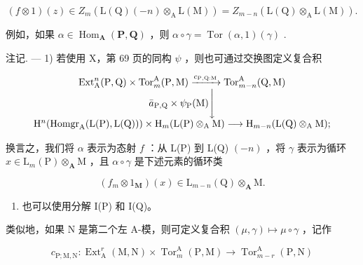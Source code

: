 \[
(f \otimes 1) (z) \in Z _ {m} (\mathrm{L} (\mathrm{Q}) (- n) \otimes_ {\mathrm{A}} \mathrm{L} (\mathrm{M})) = Z _ {m - n} (\mathrm{L} (\mathrm{Q}) \otimes_ {\mathrm{A}} \mathrm{L} (\mathrm{M})).
\]

例如，如果 \(\alpha \in \operatorname{Hom}_{\mathbf{A}}(\mathbf{P},\mathbf{Q})\) ，则 \(\alpha \circ \gamma = \operatorname{Tor}(\alpha,1)(\gamma)\) .

注记. --- 1) 若使用 X，第 69 页的同构 \(\psi\) ，则也可通过交换图定义复合积

\[
\begin{array}{c} \operatorname{Ext} _ {\mathrm{A}} ^ {n} (\mathrm{P}, \mathrm{Q}) \times \operatorname{Tor} _ {m} ^ {\mathrm{A}} (\mathrm{P}, \mathrm{M}) \xrightarrow {c _ {\mathrm{P} , \mathrm{Q} : \mathrm{M}}} \operatorname{Tor} _ {m - n} ^ {\mathrm{A}} (\mathrm{Q}, \mathrm{M}) \\ \bar {a} _ {\mathrm{P}, \mathrm{Q}} \times \psi_ {\mathrm{P}} (\mathrm{M}) \Biggl \downarrow \\ \mathrm{H} ^ {n} (\operatorname{Homgr} _ {\mathrm{A}} (\mathrm{L} (\mathrm{P}), \mathrm{L} (\mathrm{Q}))) \times \mathrm{H} _ {m} (\mathrm{L} (\mathrm{P}) \otimes_ {\mathrm{A}} \mathrm{M}) \longrightarrow \mathrm{H} _ {m - n} (\mathrm{L} (\mathrm{Q}) \otimes_ {\mathrm{A}} \mathrm{M}); \end{array}
\]

换言之，我们将 \(\alpha\) 表示为态射 \(f\) ：从 L(P) 到 L(Q) \((-n)\) ，将 \(\gamma\) 表示为循环 \(x \in \mathrm{L}_{m}(\mathrm{P}) \otimes_{\mathbf{A}} \mathrm{M}\) ，且 \(\alpha \circ \gamma\) 是下述元素的循环类

\[
\left(f _ {m} \otimes 1 _ {\mathbf {M}}\right) (x) \in \mathrm{L} _ {m - n} (\mathrm{Q}) \otimes_ {\mathbf {A}} \mathrm{M}.
\]

\begin{enumerate}
\def\labelenumi{\arabic{enumi})}
\setcounter{enumi}{1}
\tightlist
\item
  也可以使用分解 I(P) 和 I(Q)。
\end{enumerate}

类似地，如果 N 是第二个左 A-模，则可定义复合积 \((\mu, \gamma) \mapsto \mu \circ \gamma\) ，记作

\[
c _ {\mathrm{P}; \mathrm{M}, \mathrm{N}}: \operatorname{Ext} _ {\mathrm{A}} ^ {r} (\mathrm{M}, \mathrm{N}) \times \operatorname{Tor} _ {m} ^ {\mathrm{A}} (\mathrm{P}, \mathrm{M}) \rightarrow \operatorname{Tor} _ {m - r} ^ {\mathrm{A}} (\mathrm{P}, \mathrm{N})
\]

